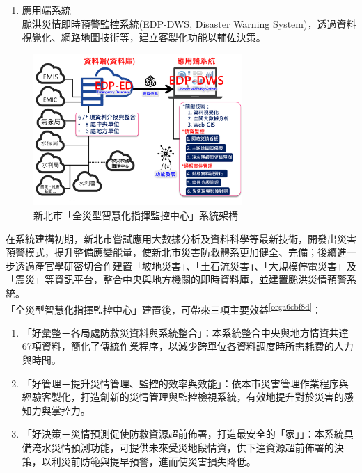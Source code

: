 \documentclass[a4paper,12pt]{article}
\begin{document}
\begin{enumerate}
\begin{enumerate}
\item 應用端系統\\
颱洪災情即時預警監控系統(EDP-DWS, Disaster Warning System)，透過資料視覺化、網路地圖技術等，建立客製化功能以輔佐決策。\\
\end{enumerate}
\begin{figure}[htbp]
\centering
\includegraphics[width=300]{images/ITS.png}
\caption{\label{fig:FigName}新北市「全災型智慧化指揮監控中心」系統架構}
\end{figure}

在系統建構初期，新北市嘗試應用大數據分析及資料科學等最新技術，開發出災害預警模式，提升整備應變能量，使新北市災害防救體系更加健全、完備；後續進一步透過產官學研密切合作建置「坡地災害」、「土石流災害」、「大規模停電災害」及「震災」等資訊平台，整合中央與地方機關的即時資料庫，並建置颱洪災情預警系統。\\

「全災型智慧化指揮監控中心」建置後，可帶來三項主要效益\textsuperscript{\ref{orga6cbf8d}}：\\
\begin{enumerate}
\item 「好彙整－各局處防救災資料與系統整合」：本系統整合中央與地方情資共達67項資料，簡化了傳統作業程序，以減少跨單位各資料調度時所需耗費的人力與時間。\\
\item 「好管理－提升災情管理、監控的效率與效能」：依本市災害管理作業程序與經驗客製化，打造創新的災情管理與監控檢視系統，有效地提升對於災害的感知力與掌控力。\\
\item 「好決策－災情預測促使防救資源超前佈署，打造最安全的「家」」：本系統具備淹水災情預測功能，可提供未來受災地段情資，供下達資源超前佈署的決策，以利災前防範與提早預警，進而使災害損失降低。\\
\end{enumerate}


\end{enumerate}
\end{document}
